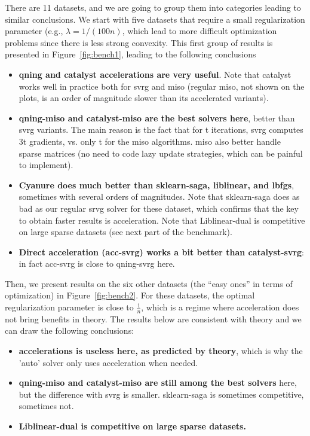 \documentclass{article}
\begin{document}
There are 11 datasets, and we are going to group them into categories leading
to similar conclusions. We start with five datasets that require a small regularization
parameter (e.g., $\lambda=1/(100n)$, which lead to more difficult
optimization problems since there is less strong convexity. This first
group of results is presented in Figure~\ref{fig:bench1}, leading to the following
conclusions
\begin{itemize}
   \item \textbf{qning and catalyst accelerations are very useful}. Note that catalyst works well in practice both for svrg and miso (regular miso, not shown on the plots, is an order of magnitude slower than its accelerated variants).  
   \item \textbf{qning-miso and catalyst-miso are the best solvers here}, better than svrg variants. The main reason is the fact that for t iterations, svrg computes 3t gradients, vs. only t for the miso algorithms. miso also better handle sparse matrices (no need to code lazy update strategies, which can be painful to implement).
   \item \textbf{Cyanure does much better than sklearn-saga, liblinear, and lbfgs}, sometimes with several orders of magnitudes. Note that sklearn-saga does as bad as our regular srvg solver for these dataset, which confirms that the key to obtain faster results is acceleration. Note that Liblinear-dual is competitive on large sparse datasets (see next part of the benchmark).
   \item \textbf{Direct acceleration (acc-svrg) works a bit better than catalyst-svrg}: in fact acc-svrg is close to qning-svrg here.
\end{itemize}
Then, we present results on the six other datasets (the ``easy ones'' in terms of optimization) in Figure~\ref{fig:bench2}.
For these datasets, the optimal regularization parameter is close to $\frac{1}{n}$,
which is a regime where acceleration does not bring benefits in theory.
The results below are consistent with theory and we can draw the following conclusions: 
\begin{itemize}
   \item \textbf{accelerations is useless here, as predicted by theory}, which is why the 'auto' solver only uses acceleration when needed. 
   \item \textbf{qning-miso and catalyst-miso are still among the best solvers} here, but the difference with svrg is smaller. sklearn-saga is sometimes competitive, sometimes not.
   \item \textbf{Liblinear-dual is competitive on large sparse datasets.}
\end{itemize}
\end{document}
